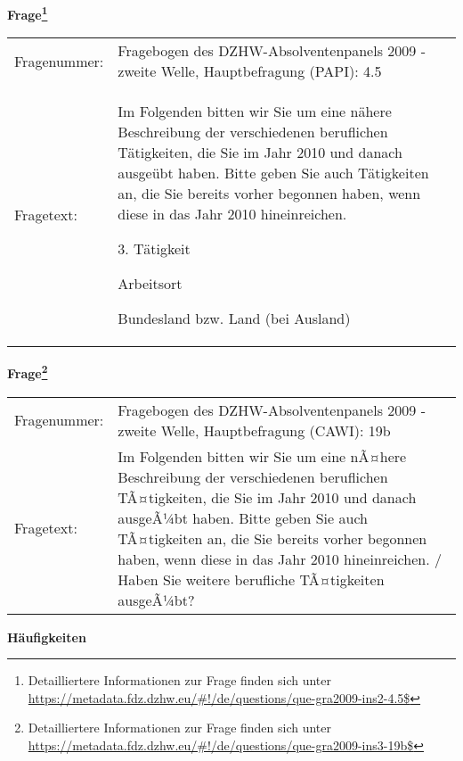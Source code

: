				\vspace*{0.5cm}
                \noindent\textbf{Frage\footnote{Detailliertere Informationen zur Frage finden sich unter
		              \url{https://metadata.fdz.dzhw.eu/\#!/de/questions/que-gra2009-ins2-4.5$}}}\\
				\begin{tabularx}{\hsize}{@{}lX}
					Fragenummer: &
					  Fragebogen des DZHW-Absolventenpanels 2009 - zweite Welle, Hauptbefragung (PAPI):
					  4.5
 \\
					Fragetext: & Im Folgenden bitten wir Sie um eine nähere Beschreibung der verschiedenen beruflichen Tätigkeiten, die Sie im Jahr 2010 und danach ausgeübt haben. Bitte geben Sie auch Tätigkeiten an, die Sie bereits vorher begonnen haben, wenn diese in das Jahr 2010 hineinreichen.\par  3. Tätigkeit\par  Arbeitsort\par  Bundesland bzw. Land (bei Ausland) \\
				\end{tabularx}
				\vspace*{0.5cm}
                \noindent\textbf{Frage\footnote{Detailliertere Informationen zur Frage finden sich unter
		              \url{https://metadata.fdz.dzhw.eu/\#!/de/questions/que-gra2009-ins3-19b$}}}\\
				\begin{tabularx}{\hsize}{@{}lX}
					Fragenummer: &
					  Fragebogen des DZHW-Absolventenpanels 2009 - zweite Welle, Hauptbefragung (CAWI):
					  19b
 \\
					Fragetext: & Im Folgenden bitten wir Sie um eine nÃ¤here Beschreibung der verschiedenen beruflichen TÃ¤tigkeiten, die Sie im Jahr 2010 und danach ausgeÃ¼bt haben. Bitte geben Sie auch TÃ¤tigkeiten an, die Sie bereits vorher begonnen haben, wenn diese in das Jahr 2010 hineinreichen. / Haben Sie weitere berufliche TÃ¤tigkeiten ausgeÃ¼bt? \\
				\end{tabularx}





        		\vspace*{0.5cm}
                \noindent\textbf{Häufigkeiten}


